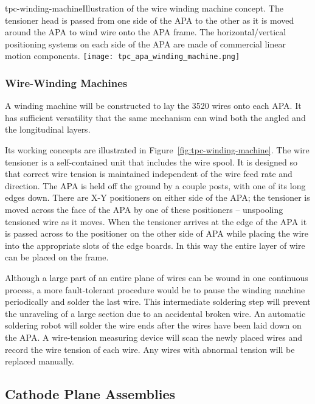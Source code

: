 \begin{cdrfigure}{tpc-winding-machine}{Illustration of the wire winding machine concept.  The tensioner head is passed from one side of the APA to the other as it is moved around the APA to wind wire onto the APA frame.  The horizontal/vertical positioning systems on each side of the APA are made of commercial linear motion components. }
\texttt{[image: tpc\_apa\_winding\_machine.png]}
\end{cdrfigure}


\subsubsection{Wire-Winding Machines}
\label{subsec:fd-ref-wirewinding}

A winding machine will be constructed to lay the 3520 wires onto each APA. It has sufficient versatility that the same mechanism can wind both the angled and the longitudinal layers.  
 
Its working concepts are illustrated in Figure~\ref{fig:tpc-winding-machine}. 
The wire tensioner is a self-contained unit that includes the wire spool.  It is designed so that correct wire tension is maintained independent of the wire feed rate and direction.  The APA is held off the ground by a couple posts, with one of its long edges down.  There are X-Y positioners on either side of the APA; the tensioner is moved across the face of the APA by one of these positioners -- unspooling tensioned wire as it moves.  When the tensioner arrives at the edge of the APA it is passed across to the positioner on the other side of APA while placing the wire into the appropriate slots of the edge boards. In this way the entire layer of wire can be placed on the frame.  

Although a large part of an entire plane of wires can be wound in one continuous process, a more fault-tolerant procedure would be to pause the winding machine periodically and solder the last wire. This intermediate soldering step will prevent the unraveling  of a large section due to an accidental broken wire.  An automatic soldering robot will solder the wire ends after the wires have been laid down on the APA. A wire-tension measuring device will scan the newly placed wires and record the wire tension of each wire. Any wires with abnormal tension will be replaced manually.



\subsection{Cathode Plane Assemblies}
\label{subsec:fd-ref-cpa}

